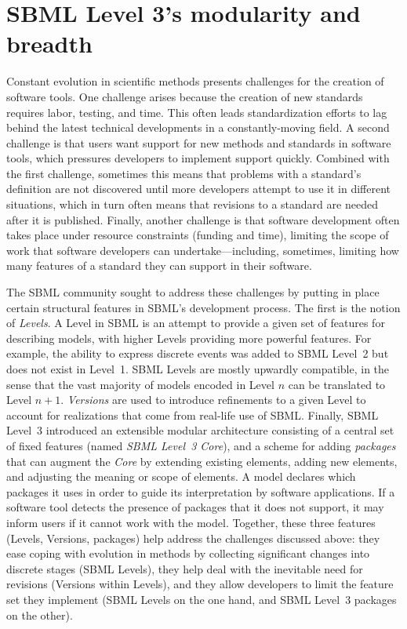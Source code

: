 \documentclass{sbml-paper}
\begin{document}
\section*{SBML Level 3's modularity and breadth}\label{sec:modularity}

Constant evolution in scientific methods presents challenges for the creation of software tools.  One challenge arises because the creation of new standards requires labor, testing, and time.  This often leads standardization efforts to lag behind the latest technical developments in a constantly-moving field.  A second challenge is that users want support for new methods and standards in software tools, which pressures developers to implement support quickly.  Combined with the first challenge, sometimes this means that problems with a standard's definition are not discovered until more developers attempt to use it in different situations, which in turn often means that revisions to a standard are needed after it is published.  Finally, another challenge is that software development often takes place under resource constraints (\eg funding and time), limiting the scope of work that software developers can undertake---including, sometimes, limiting how many features of a standard they can support in their software.

The SBML community sought to address these challenges by putting in place certain structural features in SBML's development process.  The first is the notion of \emph{Levels}.  A Level in SBML is an attempt to provide a given set of features for describing models, with higher Levels providing more powerful features.  For example, the ability to express discrete events was added to SBML Level~2 but does not exist in Level~1.  SBML Levels are mostly upwardly compatible, in the sense that the vast majority of models encoded in Level $n$ can be translated to Level $n+1$.  \emph{Versions} are used to introduce refinements to a given Level to account for realizations that come from real-life use of SBML.  Finally, SBML Level~3 introduced an extensible modular architecture consisting of a central set of fixed features (named \emph{SBML Level~3 Core}), and a scheme for adding \emph{packages} that can augment the \emph{Core} by extending existing elements, adding new elements, and adjusting the meaning or scope of elements.  A model declares which packages it uses in order to guide its interpretation by software applications.  If a software tool detects the presence of packages that it does not support, it may inform users if it cannot work with the model.  Together, these three features (Levels, Versions, packages) help address the challenges discussed above: they ease coping with evolution in methods by collecting significant changes into discrete stages (SBML Levels), they help deal with the inevitable need for revisions (Versions within Levels), and they allow developers to limit the feature set they implement (SBML Levels on the one hand, and SBML Level~3 packages on the other).
\end{document}
